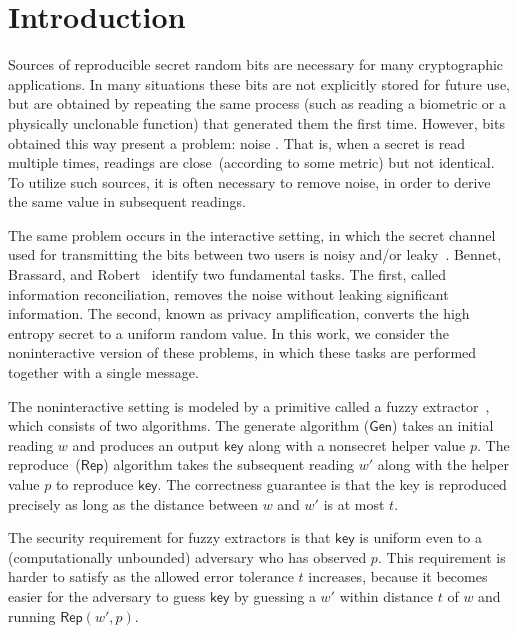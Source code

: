 \documentclass[11pt]{article}
\newcommand{\class}[1]{{\ensuremath{\mathsf{#1}}}}
\newcommand{\key}{\ensuremath{\class{key}}\xspace}
\newcommand{\gen}{\ensuremath{\class{Gen}}\xspace}
\newcommand{\rep}{\ensuremath{\class{Rep}}\xspace}
\begin{document}
\section{Introduction}
Sources of reproducible secret random bits are necessary for many cryptographic applications.  In many situations these bits are not explicitly stored for future use, but are obtained by repeating the same process  (such as reading a biometric or a physically unclonable function) that generated them the first time.
However, bits obtained this way present a problem: noise \cite{daugman2004,zviran1993comparison,brostoff2000passfaces,ellison2000protecting,mayrhofer2009shake,monrose2002password,pappu2002physical,tuyls2006puf,gassend2002silicon,suh2007physical,bennett1988privacy}.  That is, when a secret is read multiple times, readings are close~(according to some metric) but not identical.  To utilize such sources, it is often necessary to remove noise, in order to derive the same value in subsequent readings.

The same problem occurs in the interactive setting, in which the secret channel used for transmitting the bits between two users is noisy and/or leaky~\cite{wyner1975wire}. Bennet, Brassard, and Robert~\cite{bennett1988privacy} identify two fundamental tasks.  The first, called information reconciliation, removes the noise without leaking significant information. The second, known as privacy amplification, converts the high entropy secret to a uniform random value.  In this work, we consider the noninteractive version of these problems, in which these tasks are performed together with a single message.

The noninteractive setting is modeled by a primitive called a fuzzy extractor~\cite{DBLP:journals/siamcomp/DodisORS08}, which consists of two algorithms.  %
The  generate algorithm ($\gen$)  takes an initial reading $w$ and produces an output $\key$ along with a nonsecret helper value $p$.  The reproduce~($\rep$) algorithm takes the subsequent reading $w'$ along with the helper value $p$ to reproduce $\key$.   The correctness guarantee is that the key is reproduced precisely as long as the distance between $w$ and $w'$ is at most $t$. 

The security requirement for fuzzy extractors is that $\key$ is uniform even to a (computationally unbounded) adversary who has observed $p$.   This requirement is  harder to satisfy as the allowed error tolerance $t$ increases, because it becomes easier for the adversary to guess $\key$ by guessing a $w'$ within distance $t$ of $w$ and running $\rep(w',p)$.
\end{document}
